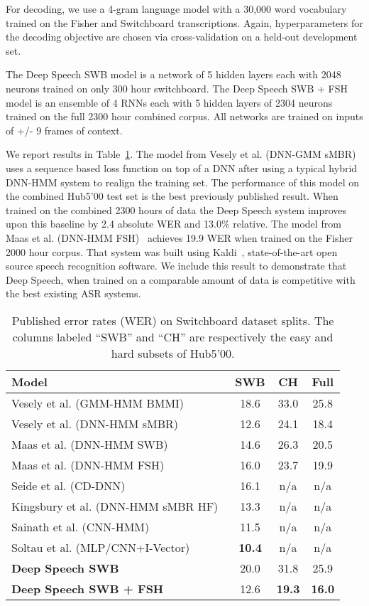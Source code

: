 For decoding, we use a 4-gram language model with a 30,000 word vocabulary
trained on the Fisher and Switchboard transcriptions. Again, hyperparameters
for the decoding objective are chosen via cross-validation on a held-out
development set.

The Deep Speech SWB model is a network of 5 hidden layers each with 2048
neurons trained on only 300 hour switchboard. The Deep Speech SWB + FSH model
is an ensemble of 4 RNNs each with 5 hidden layers of 2304 neurons trained on
the full 2300 hour combined corpus. All networks are trained on inputs of +/- 9
frames of context.

We report results in Table~\ref{table:deepspeech:hub5}. The model from Vesely
et al.  (DNN-GMM sMBR)~\cite{vesely2013} uses a sequence based loss function on
top of a DNN after using a typical hybrid DNN-HMM system to realign the
training set.  The performance of this model on the combined Hub5'00 test set
is the best previously published result. When trained on the combined 2300
hours of data the Deep Speech system improves upon this baseline by 2.4
absolute WER and 13.0\% relative. The model from Maas et al. (DNN-HMM
FSH)~\cite{maas2014} achieves 19.9 WER when trained on the Fisher 2000 hour
corpus. That system was built using Kaldi~\cite{povey2011}, state-of-the-art
open source speech recognition software. We include this result to demonstrate
that Deep Speech, when trained on a comparable amount of data is competitive
with the best existing ASR systems.

\begin{table}[ht!]
\centering
\begin{tabular}{l  c  c  c }
\toprule
Model & SWB & CH & Full \\
\midrule
Vesely et al. (GMM-HMM BMMI)~\cite{vesely2013}   & 18.6 & 33.0 & 25.8 \\
Vesely et al. (DNN-HMM sMBR)~\cite{vesely2013}    & 12.6 & 24.1  & 18.4 \\
Maas et al. (DNN-HMM SWB)~\cite{maas2014}  & 14.6 & 26.3  & 20.5 \\
Maas et al. (DNN-HMM FSH)~\cite{maas2014}  & 16.0 & 23.7  & 19.9 \\
Seide et al. (CD-DNN)~\cite{seide2011}     & 16.1 & n/a & n/a \\
Kingsbury et al. (DNN-HMM sMBR HF)~\cite{kingsbury2012}  & 13.3 & n/a & n/a \\
Sainath et al. (CNN-HMM)~\cite{sainath2013deep} & 11.5 & n/a & n/a \\
Soltau et al. (MLP/CNN+I-Vector)~\cite{soltau2014} & {\bf 10.4 } & n/a & n/a \\
{\bf Deep Speech SWB} & 20.0 & 31.8 & 25.9 \\
{\bf Deep Speech SWB + FSH} & 12.6 & {\bf 19.3} & {\bf 16.0} \\
\bottomrule
\end{tabular}
\caption{Published error rates (WER) on Switchboard dataset splits. The columns
    labeled ``SWB'' and ``CH'' are respectively the easy and hard subsets of
    Hub5'00.}
\label{table:deepspeech:hub5}
\end{table}

